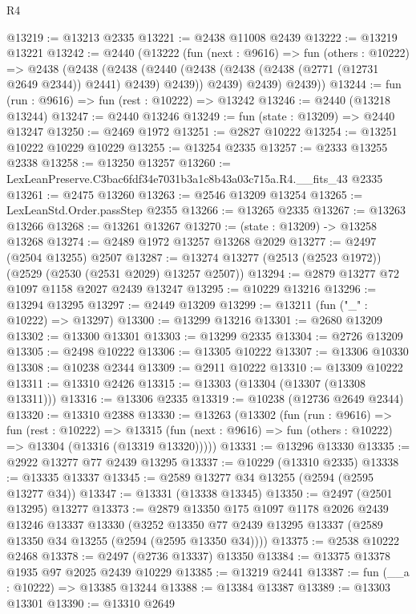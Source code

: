 \begin{lexlean}{R4}
\begin{coremodule}
@13219 := @13213 @2335
@13221 := @2438 @11008 @2439
@13222 := @13219 @13221
@13242 := @2440
    (@13222
      (fun (next : @9616) =>
      fun (others : @10222) =>
      @2438
        (@2438
          (@2438
            (@2440 (@2438 (@2438 (@2438 (@2771 (@12731 @2649 @2344)) @2441) @2439) @2439))
            @2439)
          @2439)
        @2439))
@13244 := fun (run : @9616) => fun (rest : @10222) => @13242
@13246 := @2440 (@13218 @13244)
@13247 := @2440 @13246
@13249 := fun (state : @13209) => @2440 @13247
@13250 := @2469 @1972
@13251 := @2827 @10222
@13254 := @13251 @10222 @10229 @10229
@13255 := @13254 @2335
@13257 := @2333 @13255 @2338
@13258 := @13250 @13257
@13260 := LexLeanPreserve.C3bac6fdf34e7031b3a1c8b43a03c715a.R4.__fits_43 @2335
@13261 := @2475 @13260
@13263 := @2546 @13209 @13254
@13265 := LexLeanStd.Order.passStep @2355
@13266 := @13265 @2335
@13267 := @13263 @13266
@13268 := @13261 @13267
@13270 := (state : @13209) -> @13258 @13268
@13274 := @2489 @1972 @13257 @13268 @2029
@13277 := @2497 (@2504 @13255) @2507
@13287 := @13274 @13277 (@2513 (@2523 @1972)) (@2529 (@2530 (@2531 @2029) @13257 @2507))
@13294 := @2879 @13277 @72 @1097 @1158 @2027 @2439 @13247
@13295 := @10229 @13216
@13296 := @13294 @13295
@13297 := @2449 @13209
@13299 := @13211 (fun ("_" : @10222) => @13297)
@13300 := @13299 @13216
@13301 := @2680 @13209
@13302 := @13300 @13301
@13303 := @13299 @2335
@13304 := @2726 @13209
@13305 := @2498 @10222
@13306 := @13305 @10222
@13307 := @13306 @10330
@13308 := @10238 @2344
@13309 := @2911 @10222
@13310 := @13309 @10222
@13311 := @13310 @2426
@13315 := @13303 (@13304 (@13307 (@13308 @13311)))
@13316 := @13306 @2335
@13319 := @10238 (@12736 @2649 @2344)
@13320 := @13310 @2388
@13330 := @13263
    (@13302
      (fun (run : @9616) =>
      fun (rest : @10222) =>
      @13315 (fun (next : @9616) => fun (others : @10222) => @13304 (@13316 (@13319 @13320)))))
@13331 := @13296 @13330
@13335 := @2922 @13277 @77 @2439 @13295
@13337 := @10229 (@13310 @2335)
@13338 := @13335 @13337
@13345 := @2589 @13277 @34 @13255 (@2594 (@2595 @13277 @34))
@13347 := @13331 (@13338 @13345)
@13350 := @2497 (@2501 @13295) @13277
@13373 := @2879
    @13350
    @175
    @1097
    @1178
    @2026
    @2439
    @13246
    @13337
    @13330
    (@3252 @13350 @77 @2439 @13295 @13337 (@2589 @13350 @34 @13255 (@2594 (@2595 @13350 @34))))
@13375 := @2538 @10222 @2468
@13378 := @2497 (@2736 @13337) @13350
@13384 := @13375 @13378 @1935 @97 @2025 @2439 @10229
@13385 := @13219 @2441
@13387 := fun (__a : @10222) => @13385 @13244
@13388 := @13384 @13387
@13389 := @13303 @13301
@13390 := @13310 @2649

\end{coremodule}
\end{lexlean}
